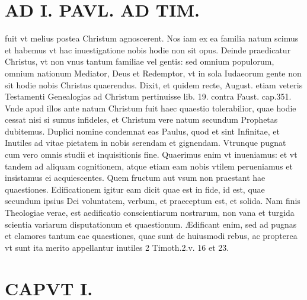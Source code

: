 \documentclass{article}
\begin{document}
\begin{pages}
\section*{AD I. PAVL. AD TIM. }
\marginpar{[ p.12 ]}\pstart fuit vt melius postea Christum agnoscerent. Nos iam ex ea familia natum scimus et habemus vt hac inuestigatione nobis hodie non sit opus. Deinde praedicatur Christus, vt non vnus tantum familiae vel gentis: sed omnium populorum, omnium nationum Mediator, Deus et Redemptor, vt in sola Iudaeorum gente non sit hodie nobis Christus quaerendus. Dixit, et quidem recte, August. etiam veteris Testamenti Genealogias ad Christum pertinuisse lib. 19. contra Faust. cap.351. Vnde apud illos ante natum Christum fuit haec quaestio tolerabilior, quae hodie cessat nisi si sumus infideles, et Christum vere natum secundum Prophetas dubitemus. Duplici nomine condemnat eas Paulus, quod et sint Infinitae, et Inutiles ad vitae pietatem in nobis serendam et gignendam. Vtrunque pugnat cum vero omnis studii et inquisitionis fine. Quaerimus enim vt inueniamus: et vt tandem ad aliquam cognitionem, atque etiam eam nobis vtilem perueniamus et insistamus ei acquiescentes. Quem fructum aut vsum non praestant hae quaestiones. Edificationem igitur eam dicit quae est in fide, id est, quae secundum ipsius Dei voluntatem, verbum, et praeceptum est, et solida. Nam finis Theologiae verae, est aedificatio conscientiarum nostrarum, non vana et turgida scientia variarum disputationum et quaestionum. Ædificant enim, sed ad pugnas et clamores tantum eae quaestiones, quae sunt de huiusmodi rebus, ac propterea vt sunt ita merito appellantur inutiles 2 Timoth.2.v. 16 et 23.  \pend
\section*{CAPVT  I. }
\marginpar{[ p.13 ]}\pstart {}
{}

\end{pages}
\end{document}
